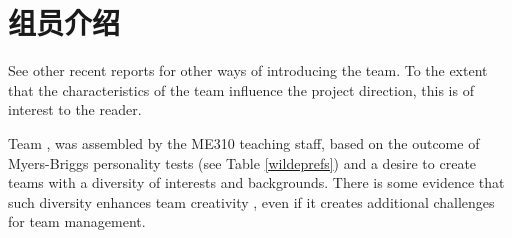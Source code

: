 
\section{组员介绍}
\label{sec:team}

\begin{remark} \color{blue}
See other recent reports for other ways of introducing the team. To the extent that the characteristics of the team influence the project direction, this is of interest to the reader.
\end{remark} \normalcolor

Team \pmt, was assembled by the ME310 teaching staff, based on the outcome of Myers-Briggs personality tests (see Table \ref{wildeprefs}) and a desire to create teams with a diversity of interests and backgrounds. There is some evidence that such diversity enhances team creativity \cite{Wilde97} \cite{Wilde07}, even if it creates additional challenges for team management.



